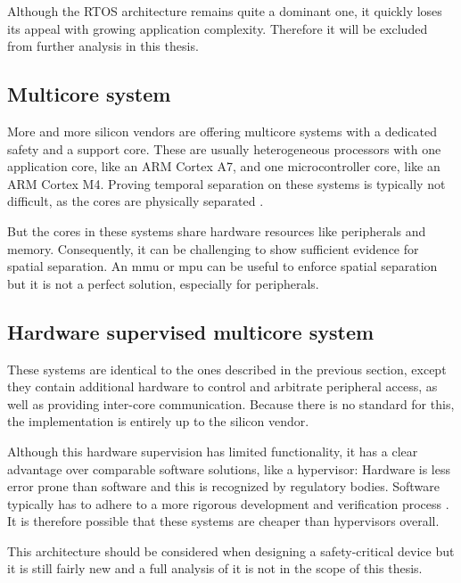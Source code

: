 Although the RTOS architecture remains quite a dominant one, it quickly loses its appeal with growing application complexity. Therefore it will be excluded from further analysis in this thesis.
\subsection{Multicore system}
More and more silicon vendors are offering multicore systems with a dedicated safety and a support core. These are usually heterogeneous processors with one application core, like an ARM Cortex A7, and one microcontroller core, like an ARM Cortex M4. Proving temporal separation on these systems is typically not difficult, as the cores are physically separated \cite{Wittenstein.temporal.2017}.

But the cores in these systems share hardware resources like peripherals and memory. Consequently, it can be challenging to show sufficient evidence for spatial separation. An \acrshort{mmu} or \acrshort{mpu} can be useful to enforce spatial separation but it is not a perfect solution, especially for peripherals.
\subsection{Hardware supervised multicore system}
These systems are identical to the ones described in the previous section, except they contain additional hardware to control and arbitrate peripheral access, as well as providing inter-core communication.
Because there is no standard for this, the implementation is entirely up to the silicon vendor. 

Although this hardware supervision has limited functionality, it has a clear advantage over comparable software solutions, like a hypervisor: Hardware is less error prone than software and this is recognized by regulatory bodies. Software typically has to adhere to a more rigorous development and verification process \cite{IEC.2010-3}. It is therefore possible that these systems are cheaper than hypervisors overall. 

This architecture should be considered when designing a safety-critical device but it is still fairly new and a full analysis of it is not in the scope of this thesis.
